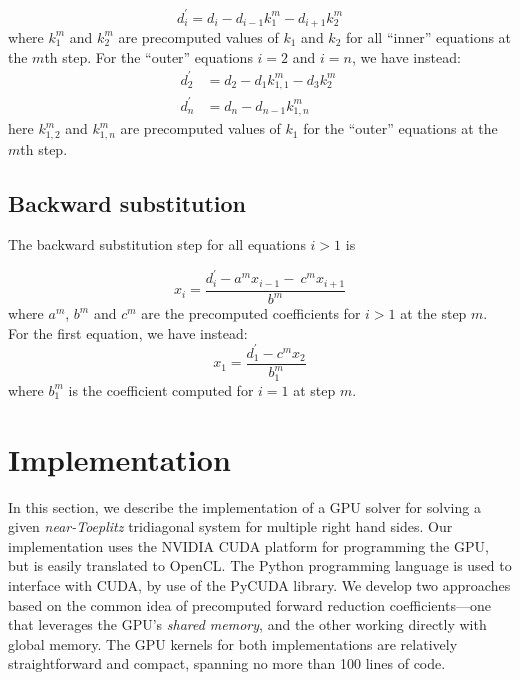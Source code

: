 \begin{equation}
d^{\prime}_i = d_i - d_{i-1}k_1^{m}  - d_{i+1}k_2^{m}
\label{eqn:precomputed-forward-reduction-step}
\end{equation}
%
where $k_1^m$ and $k_2^m$ are
precomputed values of $k_1$ and $k_2$
for all ``inner'' equations at the $m$th step.
For the ``outer'' equations $i=2$ and $i=n$,
we have instead:
%
\begin{align}
    d^{\prime}_2 &= d_2 - d_{1}k_{1,1}^{m}  - d_{3}k_2^{m} \
    \label{eqn:precomputed-forward-reduction-step-2} \\
    d^{\prime}_n &= d_n - d_{n-1}k_{1,n}^{m} \
    \label{eqn:precomputed-forward-reduction-step-n} 
\end{align}
%
here $k_{1,2}^m$ and $k_{1,n}^m$ are
precomputed values of $k_1$
for the ``outer'' equations at the $m$th step.

\subsection{Backward substitution}

The backward substitution step for all equations $i > 1$ is

\begin{equation}
x_i = \frac{d^{\prime}_i - a^mx_{i-1} - \
    c^{m}x_{i+1}}{b^m}
\label{eqn:precomputed-backward-substitution-step}
\end{equation}
%
where $a^m$, $b^m$ and $c^m$ are the precomputed
coefficients for $i>1$ at the step $m$.
For the first equation, we have instead:
%
\begin{equation}
x_1 = \frac{d^{\prime}_1 - c^{m}x_{2}}{b_1^m}
\label{eqn:precomputed-backward-substitution-step-1}
\end{equation}
%
where $b_1^m$ is the
coefficient computed for $i = 1$ at step $m$.

\section{Implementation}

In this section, we describe the implementation of a GPU solver
for solving a given \emph{near-Toeplitz} tridiagonal system
for multiple right hand sides.
Our implementation uses the
NVIDIA CUDA platform for programming the GPU,
but is easily translated to OpenCL.
The Python programming language is used
to interface with CUDA, by use of the
PyCUDA \cite{kloeckner_pycuda_2012} library.
We develop two approaches based on the common idea
of precomputed forward reduction coefficients---one that leverages
the GPU's \emph{shared memory},
and the other working directly with global memory.
The GPU kernels for both implementations are relatively
straightforward and compact,
spanning no more than 100 lines of code.

